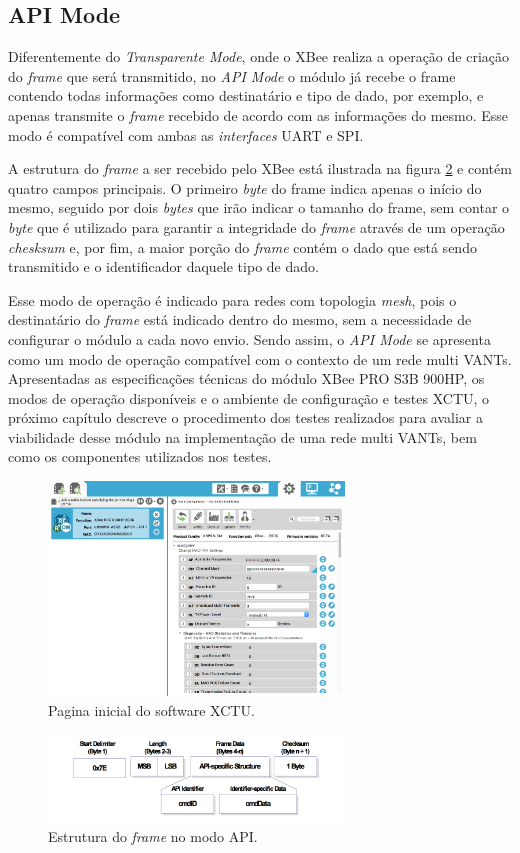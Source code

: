 \subsection{API Mode}

Diferentemente do \emph{Transparente Mode}, onde o XBee realiza a operação de criação do \emph{frame} que será transmitido, no \emph{API Mode} o módulo já recebe o frame contendo todas informações como destinatário e tipo de dado, por exemplo, e apenas transmite o \emph{frame} recebido de acordo com as informações do mesmo. Esse modo é compatível com ambas as \emph{interfaces} UART e SPI.

A estrutura do \emph{frame} a ser recebido pelo XBee está ilustrada na figura \ref{fig:apiframe} e contém quatro campos principais. O primeiro \emph{byte} do frame indica apenas o início do mesmo, seguido por dois \emph{bytes} que irão indicar o tamanho do frame, sem contar o \emph{byte} que é utilizado para garantir a integridade do \emph{frame} através de um operação \emph{chesksum} e, por fim, a maior porção do \emph{frame} contém o dado que está sendo transmitido e o identificador daquele tipo de dado.

Esse modo de operação é indicado para redes com topologia \emph{mesh}, pois o destinatário do \emph{frame} está indicado dentro do mesmo, sem a necessidade de configurar o módulo a cada novo envio. Sendo assim, o \emph{API Mode} se apresenta como um modo de operação compatível com o contexto de um rede multi VANTs.\\

Apresentadas as especificações técnicas do módulo XBee PRO S3B 900HP, os modos de operação disponíveis e o ambiente de configuração e testes XCTU, o próximo capítulo descreve o procedimento dos testes realizados para avaliar a viabilidade desse módulo na implementação de uma rede multi VANTs, bem como os componentes utilizados nos testes. 

\begin{figure} 
\center
\includegraphics[width=0.7\textwidth]{xctu.png}
\caption{Pagina inicial do software XCTU.} 
\label{fig:xctu}
\end{figure}

\begin{figure} 
\center
\includegraphics[width=0.7\textwidth]{apiframe.png}
\caption{Estrutura do \emph{frame} no modo API.} 
\label{fig:apiframe}
\end{figure}